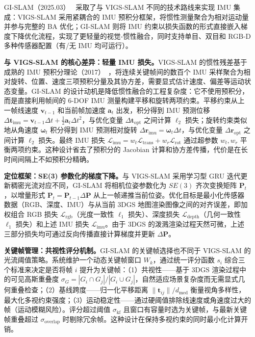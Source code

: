 GI-SLAM（2025.03）~\cite{2503_18275} 采取了与 VIGS-SLAM 不同的技术路线来实现 IMU 集成：VIGS-SLAM 采用紧耦合的 IMU 预积分框架，将惯性测量聚合为相对运动量并参与完整的 BA 优化；GI-SLAM 则将 IMU 约束以损失函数的形式直接嵌入梯度下降优化流程，实现了更轻量的视觉-惯性融合，同时支持单目、双目和 RGB-D 多种传感器配置（有/无 IMU 均可运行）。

\textbf{与 VIGS-SLAM 的核心差异：轻量 IMU 损失。}VIGS-SLAM 的惯性残差基于成熟的 IMU 预积分理论（2017）~\cite{forster2015imu}，将连续关键帧间的数百个 IMU 采样聚合为相对旋转、位置、速度三项预积分量及其协方差，需要显式估计速度、偏差等运动状态变量。GI-SLAM 的设计动机是降低惯性融合的工程复杂度：它不使用预积分，而是直接利用帧间的 6-DOF IMU 测量构建平移和旋转两项约束。平移约束从上一帧线速度 $\mathbf{v}_{t-1}$ 和当前帧加速度 $\mathbf{a}_t$ 出发，积分得到 IMU 预测位移 $\Delta\mathbf{t}_{\mathrm{imu}} = \mathbf{v}_{t-1}\Delta t + \frac{1}{2}\mathbf{a}_t\Delta t^2$，与优化变量 $\Delta\mathbf{t}_{\mathrm{opt}}$ 之间计算 $\ell_2$ 损失；旋转约束类似地从角速度 $\boldsymbol{\omega}_t$ 积分得到 IMU 预测相对旋转 $\Delta\mathbf{r}_{\mathrm{imu}} = \boldsymbol{\omega}_t\Delta t$，与优化变量 $\Delta\mathbf{r}_{\mathrm{opt}}$ 之间计算 $\ell_2$ 损失。最终 IMU 损失 $\mathcal{L}_{\mathrm{imu}} = w_t\mathcal{L}_{\mathrm{trans}} + w_r\mathcal{L}_{\mathrm{rot}}$ 通过超参数 $w_t, w_r$ 平衡两项约束。这种设计省去了预积分的 Jacobian 计算和协方差传播，代价是在长时间间隔上不如预积分精确。

\textbf{定位框架：SE(3) 参数化的梯度下降。}与 VIGS-SLAM 采用学习型 GRU 迭代更新稠密光流对应不同，GI-SLAM 将相机位姿参数化为 $SE(3)$ 齐次变换矩阵 $\mathbf{P}_t$，以增量形式 $\mathbf{P}_t = \mathbf{P}_{t-1}\Delta\mathbf{P}$ 从上一帧递推当前位姿。优化目标是最小化传感器数据（RGB、深度、IMU）与从当前 3DGS 地图渲染图像之间的对齐误差，即加权组合 RGB 损失 $\mathcal{L}_{\mathrm{rgb}}$（光度一致性 $\ell_1$ 损失）、深度损失 $\mathcal{L}_{\mathrm{depth}}$（几何一致性 $\ell_1$ 损失）和上述 IMU 损失 $\mathcal{L}_{\mathrm{imu}}$。由于 3DGS 的泼溅渲染过程天然可微，上述三部分损失均可通过反向传播直接计算梯度并更新 $\Delta\mathbf{P}$。

\textbf{关键帧管理：共视性评分机制。}GI-SLAM 的关键帧选择也不同于 VIGS-SLAM 的光流阈值策略。系统维护一个动态关键帧窗口 $W_k$，通过统一评分函数 $s_i$ 综合三个标准来决定是否将帧 $i$ 提升为关键帧：（1）共视性——基于 3DGS 渲染过程中的可见高斯重叠度 $\sigma_G = |G_i \cap G_j| / |G_i \cup G_j|$，自然适应场景复杂度而无需显式几何重叠检查；（2）基线跨度——归一化平移距离 $\|\mathbf{t}_{ij}\|/d_{\mathrm{med}}$ 衡量视角多样性，最大化多视约束强度；（3）运动稳定性——通过硬阈值排除线速度或角速度过大的帧（运动模糊风险）。评分超过阈值 $\sigma_{\mathrm{kf}}$ 且窗口有容量时选为关键帧，与最新关键帧重叠超过 $\sigma_{\mathrm{overlap}}$ 时剔除冗余帧。这种设计在保持多视约束的同时最小化计算开销。

